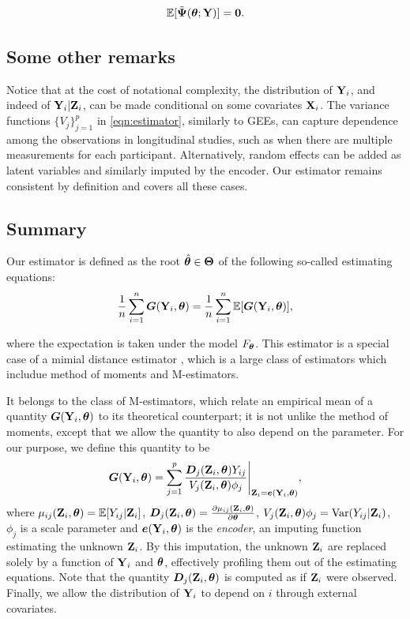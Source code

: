 \documentclass[twoside,11pt]{article}
\newcommand{\gb}[2][]{\todo[color=gbcolor, caption={GB}, #1]{#2}}
\newcommand{\E}{{\mathbb{E}}}
\begin{document}
\begin{equation}
    \E[\tilde{\bm\Psi}(\bt;\Y)] = \bm 0.
\end{equation}

\subsection{Some other remarks}

Notice that at the cost of notational complexity, the distribution of ${\bf Y}_i$, and indeed of ${\bf Y}_i|{\bf Z}_i$, can be made conditional on some covariates ${\bf X}_i$.
The variance functions $\{V_j\}_{j=1}^p$ in \eqref{eqn:estimator}, similarly to GEEs, can capture dependence among the observations in longitudinal studies, such as when there are multiple measurements for each participant. Alternatively, random effects can be added as latent variables and similarly imputed by the encoder. Our estimator remains consistent by definition and covers all these cases.


\subsection{Summary}
Our estimator is defined as the root $\hat{{\bm{\theta}}}\in\bm\Theta$ of the following so-called estimating equations:
%
\begin{equation}
    \frac{1}{n}\sum_{i=1}^n \bm G(\Y_i, \bt) = \frac{1}{n}\sum_{i=1}^n \E[\bm G(\Y_i, \bt)],
\end{equation}

%
where the expectation is taken under the model $F_{{\bm{\theta}}}$. This estimator is a special case of a mimial distance estimator \gb{cite}, which is a large class of estimators which includue method of moments and M-estimators. 

It belongs to the class of M-estimators, which relate an empirical mean of a quantity $\bm G({\bf Y}_i, {\bm{\theta}})$ to its theoretical counterpart\gb{cite something}; it is not unlike the method of moments, except that we allow the quantity to also depend on the parameter. For our purpose, we define this quantity to be
%
\begin{equation}
    \bm G({\bf Y}_i, {\bm{\theta}}) = \sum_{j=1}^p \frac{\bm D_j({\bf Z}_i, {\bm{\theta}}) Y_{ij}}{V_j({\bf Z}_i, {\bm{\theta}})\phi_j}\Bigg\vert_{{\bf Z}_i={\bm e}({\bf Y}_i, {\bm{\theta}})},
\end{equation}
%
where $\mu_{ij}(\Z_i, \bt) = \E[Y_{ij}|\Z_i]$, $\bm D_j({\bf Z}_i, {\bm{\theta}}) = \frac{\partial \mu_{ij}({\bf Z}_i, {\bm{\theta}})}{\partial{\bm{\theta}}} $, $V_j({\bf Z}_i, {\bm{\theta}})\phi_j = \text{Var}(Y_{ij}|{\bf Z}_i)$, $\phi_j$ is a scale parameter and ${\bm e}({\bf Y}_i, {\bm{\theta}})$ is the \textit{encoder}, an imputing function estimating the unknown ${\bf Z}_i$. By this imputation, the unknown ${\bf Z}_i$ are replaced solely by a function of ${\bf Y}_i$ and ${\bm{\theta}}$, effectively profiling them out of the estimating equations. Note that the quantity $\bm D_j({\bf Z}_i, {\bm{\theta}})$ is computed as if ${\bf Z}_i$ were observed. Finally, we allow the distribution of ${\bf Y}_i$ to depend on $i$ through external covariates.
\end{document}
